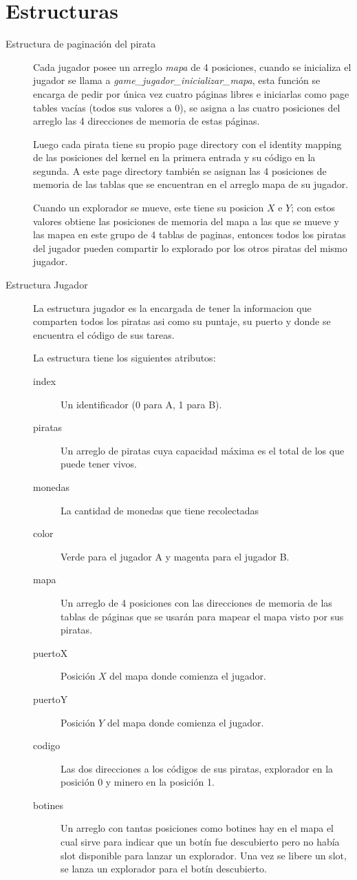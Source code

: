 \section{Estructuras}

\begin{description}
\item[Estructura de paginación del pirata]
  Cada jugador posee un arreglo {\it mapa\/} de 4 posiciones, cuando se
  inicializa el jugador se llama a {\it game_jugador_inicializar_mapa\/}, esta
  función se encarga de pedir por única vez cuatro páginas libres e iniciarlas
  como page tables vacías (todos sus valores a 0), se asigna a las cuatro
  posiciones del arreglo las 4 direcciones de memoria de estas páginas.

  Luego cada pirata tiene su propio page directory con el identity mapping de
  las posiciones del kernel en la primera entrada y su código en la segunda. A
  este page directory también se asignan las 4 posiciones de memoria de las
  tablas que se encuentran en el arreglo mapa de su jugador.

  Cuando un explorador se mueve, este tiene su posicion $X$ e $Y$; con estos valores
  obtiene las posiciones de memoria del mapa a las que se mueve y las mapea en
  este grupo de 4 tablas de paginas, entonces todos los piratas del jugador
  pueden compartir lo explorado por los otros piratas del mismo jugador.

\item[Estructura Jugador]
  La estructura jugador es la encargada de tener la informacion que comparten todos los piratas asi como
  su puntaje, su puerto y donde se encuentra el código de sus tareas.

  La estructura tiene los siguientes atributos:

  \begin{description}
    \item[index] Un identificador (0 para A, 1 para B).
    \item[piratas] Un arreglo de piratas cuya capacidad máxima es el total de
    los que puede tener vivos.
    \item[monedas] La cantidad de monedas que tiene recolectadas
    \item[color] Verde para el jugador A y magenta para el jugador B.
    \item[mapa] Un arreglo de 4 posiciones con las direcciones de memoria de
    las tablas de páginas que se usarán para mapear el mapa visto por sus
    piratas.
    \item[puertoX] Posición $X$ del mapa donde comienza el jugador.
    \item[puertoY] Posición $Y$ del mapa donde comienza el jugador.
    \item[codigo] Las dos direcciones a los códigos de sus piratas, explorador
    en la posición 0 y minero en la posición 1.
    \item[botines] Un arreglo con tantas posiciones como botines hay en el mapa
    el cual sirve para indicar que un botín fue descubierto pero no había slot
    disponible para lanzar un explorador. Una vez se libere un slot, se lanza
    un explorador para el botín descubierto.
  \end{description}


\end{description}
